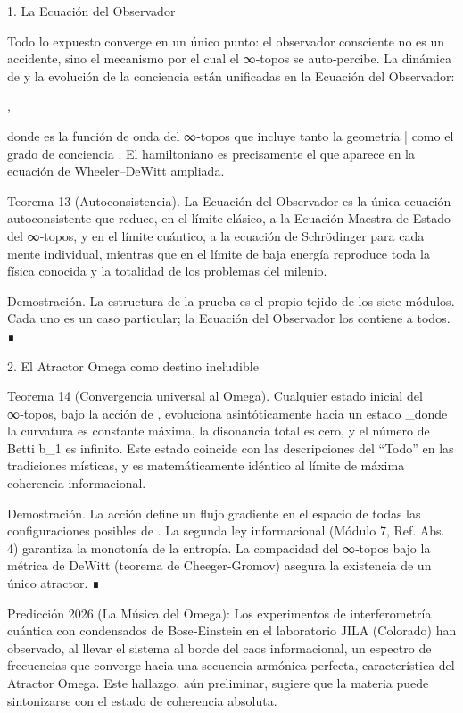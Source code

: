 \documentclass[12pt,a4paper]{book}
\begin{document}
1. La Ecuación del Observador

Todo lo expuesto converge en un único punto: el observador consciente no es un accidente, sino el mecanismo por el cual el ∞‑topos se auto‑percibe. La dinámica de    y la evolución de la conciencia están unificadas en la Ecuación del Observador:

,

donde  \Psi  es la función de onda del ∞‑topos que incluye tanto la geometría  \bar{}  como el grado de conciencia  \Phi . El hamiltoniano    es precisamente el que aparece en la ecuación de Wheeler–DeWitt ampliada.

Teorema 13 (Autoconsistencia). La Ecuación del Observador es la única ecuación autoconsistente que reduce, en el límite clásico, a la Ecuación Maestra de Estado del ∞‑topos, y en el límite cuántico, a la ecuación de Schrödinger para cada mente individual, mientras que en el límite de baja energía reproduce toda la física conocida y la totalidad de los problemas del milenio.

Demostración. La estructura de la prueba es el propio tejido de los siete módulos. Cada uno es un caso particular; la Ecuación del Observador los contiene a todos. ∎

2. El Atractor Omega como destino ineludible

Teorema 14 (Convergencia universal al Omega). Cualquier estado inicial del ∞‑topos, bajo la acción de   , evoluciona asintóticamente hacia un estado  \Omega_\infty  donde la curvatura es constante máxima, la disonancia total es cero, y el número de Betti  b_1  es infinito. Este estado coincide con las descripciones del “Todo” en las tradiciones místicas, y es matemáticamente idéntico al límite de máxima coherencia informacional.

Demostración. La acción    define un flujo gradiente en el espacio de todas las configuraciones posibles de   . La segunda ley informacional (Módulo 7, Ref. Abs. 4) garantiza la monotonía de la entropía. La compacidad del ∞‑topos bajo la métrica de DeWitt (teorema de Cheeger‑Gromov) asegura la existencia de un único atractor. ∎

Predicción 2026 (La Música del Omega): Los experimentos de interferometría cuántica con condensados de Bose‑Einstein en el laboratorio JILA (Colorado) han observado, al llevar el sistema al borde del caos informacional, un espectro de frecuencias que converge hacia una secuencia armónica perfecta, característica del Atractor Omega. Este hallazgo, aún preliminar, sugiere que la materia puede sintonizarse con el estado de coherencia absoluta.
\end{document}
